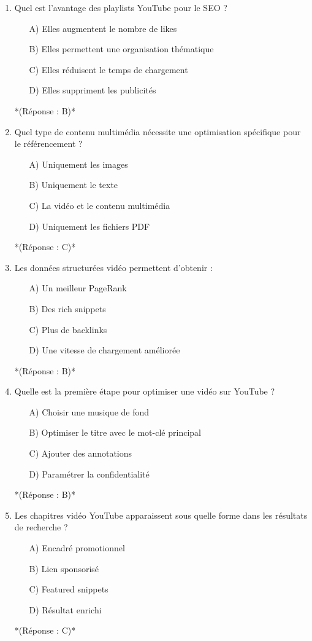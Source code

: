 \documentclass[12pt,a4paper,twoside]{report}
\begin{document}
\begin{enumerate}
    \item Quel est l'avantage des playlists YouTube pour le SEO ?
    \begin{itemize}
        \item[A)] Elles augmentent le nombre de likes
        \item[B)] Elles permettent une organisation thématique
        \item[C)] Elles réduisent le temps de chargement
        \item[D)] Elles suppriment les publicités
    \end{itemize}
    *(Réponse : B)*

    \item Quel type de contenu multimédia nécessite une optimisation spécifique pour le référencement ?
    \begin{itemize}
        \item[A)] Uniquement les images
        \item[B)] Uniquement le texte
        \item[C)] La vidéo et le contenu multimédia
        \item[D)] Uniquement les fichiers PDF
    \end{itemize}
    *(Réponse : C)*

    \item Les données structurées vidéo permettent d'obtenir :
    \begin{itemize}
        \item[A)] Un meilleur PageRank
        \item[B)] Des rich snippets
        \item[C)] Plus de backlinks
        \item[D)] Une vitesse de chargement améliorée
    \end{itemize}
    *(Réponse : B)*

    \item Quelle est la première étape pour optimiser une vidéo sur YouTube ?
    \begin{itemize}
        \item[A)] Choisir une musique de fond
        \item[B)] Optimiser le titre avec le mot-clé principal
        \item[C)] Ajouter des annotations
        \item[D)] Paramétrer la confidentialité
    \end{itemize}
    *(Réponse : B)*

    \item Les chapitres vidéo YouTube apparaissent sous quelle forme dans les résultats de recherche ?
    \begin{itemize}
        \item[A)] Encadré promotionnel
        \item[B)] Lien sponsorisé
        \item[C)] Featured snippets
        \item[D)] Résultat enrichi
    \end{itemize}
    *(Réponse : C)*


\end{enumerate}
\end{document}
